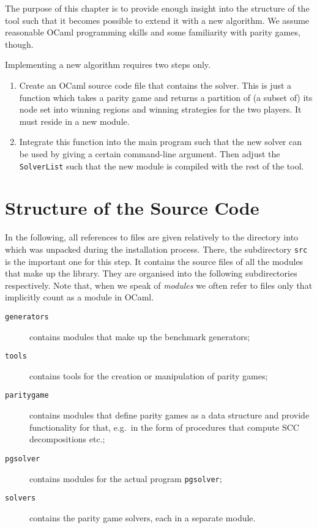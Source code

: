 \label{chp:devguide}

The purpose of this chapter is to provide enough insight into the structure
of the \pgsolver tool such that it becomes possible to extend it with a new algorithm.
We assume reasonable OCaml programming skills and some familiarity with parity games, though.

Implementing a new algorithm requires two steps only.
\begin{enumerate}
\item Create an OCaml source code file that contains the solver. This is just a function
      which takes a parity game and returns a partition of (a subset of) its node set into
      winning regions and winning strategies for the two players. It must reside in a new
      module.
\item Integrate this function into the main program such that the new solver can be used
      by giving \pgsolver a certain command-line argument. Then adjust the
      \texttt{SolverList} such that the new module is compiled with the rest of the tool.
\end{enumerate}


\section{Structure of the Source Code}

In the following, all references to files are given relatively to the directory into which
\pgsolver was unpacked during the installation process. There, the subdirectory \texttt{src}
is the important one for this step. It contains the source files of all the modules that
make up the \pgsolver library. They are organised into the following subdirectories respectively.
Note that, when we speak of \emph{modules} we often refer to files only that implicitly count as
a module in OCaml.
\begin{description}
\item[\texttt{generators}] contains modules that make up the benchmark generators;
\item[\texttt{tools}] contains tools for the creation or manipulation of parity games;
\item[\texttt{paritygame}] contains modules that define parity games as a data structure and
     provide functionality for that, e.g.\ in the form of procedures that compute SCC decompositions
     etc.;
\item[\texttt{pgsolver}] contains modules for the actual program \texttt{pgsolver};
\item[\texttt{solvers}] contains the parity game solvers, each in a separate module.
\end{description}

